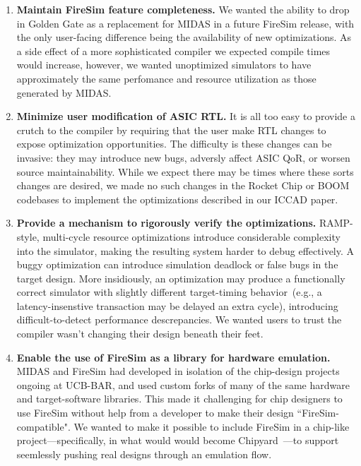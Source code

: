 \begin{enumerate}
\item \textbf{Maintain FireSim feature completeness.} We wanted the ability to
drop in Golden Gate as a replacement for MIDAS in a future FireSim release, with the
only user-facing difference being the availability of new
optimizations. As a side effect of a more sophisticated compiler we expected
compile times would increase, however, we wanted unoptimized simulators to have
approximately the same perfomance and resource utilization as those generated by MIDAS.

\item \textbf{Minimize user modification of ASIC RTL.} It is all too easy to
provide a crutch to the compiler by requiring that the user make RTL changes to expose
optimization opportunities. The difficulty is these changes can be
invasive: they may introduce new bugs, adversly affect ASIC QoR, or worsen source maintainability. While we expect there
may be times where these sorts changes are desired, we made no such
changes in the Rocket Chip or BOOM codebases to implement the optimizations
described in our ICCAD paper.

\item \textbf{Provide a mechanism to rigorously verify the optimizations.} RAMP-style, multi-cycle resource optimizations introduce considerable complexity into the
simulator, making the resulting system harder to debug
effectively. A buggy optimization can introduce simulation deadlock or false
bugs in the target design.
More insidiously, an optimization may produce a functionally correct simulator with slightly
different target-timing behavior~(e.g., a latency-insenstive transaction may be delayed an extra cycle), introducing difficult-to-detect performance
descrepancies. We wanted users to trust the compiler wasn't changing their
design beneath their feet.

\item \textbf{Enable the use of FireSim as a library for hardware emulation.}
MIDAS and FireSim had developed in isolation of the chip-design projects
ongoing at UCB-BAR, and used custom forks of many of the same hardware and
target-software libraries. This made it challenging for chip designers to use
FireSim without help from a developer to make their design ``FireSim-compatible". We
wanted to make it possible to include FireSim in a chip-like project---specifically, in what would
would become Chipyard~\cite{Chipyard}---to support seemlessly pushing real
designs through an emulation flow.
\end{enumerate}

